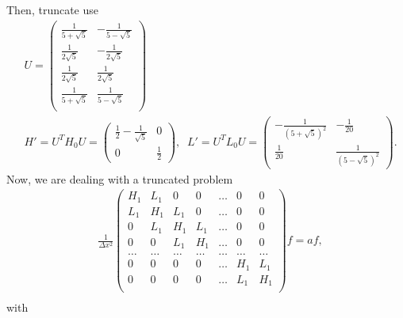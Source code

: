 Then, truncate use
\begin{equation}
\begin{split}
&U=\begin{pmatrix}
\frac{1}{5+\sqrt{5}} & -\frac{1}{5-\sqrt{5}} \\
\frac{1}{2\sqrt{5}} & -\frac{1}{2\sqrt{5}} \\
\frac{1}{2\sqrt{5}} & \frac{1}{2\sqrt{5}} \\
\frac{1}{5+\sqrt{5}} & \frac{1}{5-\sqrt{5}} \\
\end{pmatrix}\\
&H'=U^T H_0 U = \begin{pmatrix}\frac{1}{2}-\frac{1}{\sqrt{5}} & 0 \\ 0 & \frac{1}{2}\end{pmatrix},\;\;
L'=U^T L_0 U = \begin{pmatrix}-\frac{1}{(5+\sqrt{5})^2} & -\frac{1}{20} \\ \frac{1}{20} & \frac{1}{(5-\sqrt{5})^2}\end{pmatrix}.
\end{split}
\end{equation}
Now, we are dealing with a truncated problem
\begin{equation}
\begin{split}
&\frac{1}{\Delta x^2}\begin{pmatrix}
H_1 & L_1 & 0 & 0 & \ldots & 0 & 0 \\
L_1 & H_1 & L_1 & 0 & \ldots & 0 & 0 \\
0 & L_1 & H_1 & L_1 & \ldots & 0 & 0 \\
0 & 0 & L_1 & H_1 & \ldots & 0 & 0 \\
\ldots & \ldots & \ldots & \ldots & \ldots & \ldots & \ldots \\
0 & 0 & 0 & 0 & \ldots & H_1 & L_1 \\
0 & 0 & 0 & 0 & \ldots & L_1 & H_1 \\
\end{pmatrix}f
=a f,\\
\end{split}
\end{equation}
with
